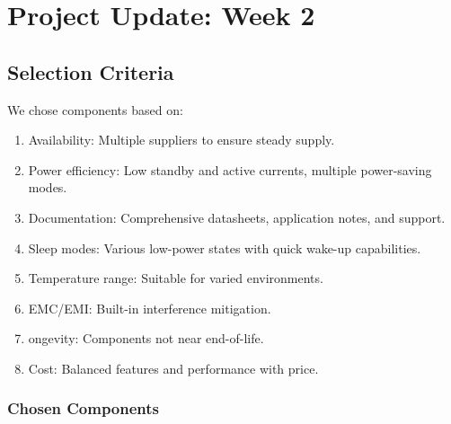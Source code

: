 \documentclass[a4paper,11pt]{article}%
\begin{document}
\pagebreak

\section{\color{red}Project Update: Week 2}

\subsection{Selection Criteria}
We chose components based on:

\begin{enumerate}
    \item Availability: Multiple suppliers to ensure steady supply.
    \item Power efficiency: Low standby and active currents, multiple power-saving modes.
    \item Documentation: Comprehensive datasheets, application notes, and support.
    \item Sleep modes: Various low-power states with quick wake-up capabilities.
    \item Temperature range: Suitable for varied environments.
    \item EMC/EMI: Built-in interference mitigation.
    \item ongevity: Components not near end-of-life.
    \item Cost: Balanced features and performance with price.
\end{enumerate}


\subsubsection{Chosen Components}
\end{document}
